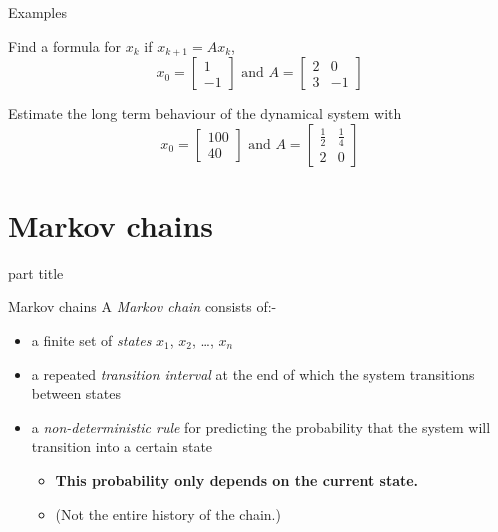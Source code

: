 \documentclass{beamer}
\begin{document}
\begin{frame}{Examples}
\begin{example}
	Find a formula for $x_k$ if $x_{k+1} = Ax_k$,
	\begin{equation*}
	x_0 = \left[
	\begin{matrix}
	1\\
	-1
	\end{matrix}
	\right] \text{ and } A = \left[
	\begin{matrix}
	2&0\\
	3&-1
	\end{matrix}
	\right]
	\end{equation*}
\end{example}
\begin{example}
	Estimate the long term behaviour of the dynamical system with
	\begin{equation*}
	x_0 = \left[
	\begin{matrix}
	100\\
	40
	\end{matrix}
	\right] \text{ and }
	A = \left[
	\begin{matrix}
	\frac{1}{2}&\frac{1}{4}\\
	2&0
	\end{matrix}
	\right]
	\end{equation*}

\end{example}
\end{frame}

\section{Markov chains}

\begin{frame}
\begin{beamercolorbox}[sep=12pt,center]{part title}
\insertsection\par
\end{beamercolorbox}
\end{frame}

\begin{frame}{Markov chains}
A \emph{Markov chain} consists of:-\vfill
\begin{itemize}
	\item a finite set of \emph{states} $x_1$, $x_2$, \dots, $x_n$\vfill
	\item a repeated \emph{transition interval} at the end of which the system transitions between states\vfill
	\item a \emph{non-deterministic rule} for predicting the probability that the system will transition into a certain state
	\begin{itemize}
		\item {\bf This probability only depends on the current state.}
		\item (Not the entire history of the chain.)
	\end{itemize}
\end{itemize}
\end{frame}
\end{document}

